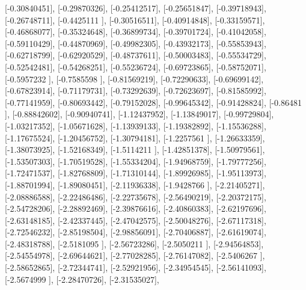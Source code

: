 \documentclass{article}
\begin{document}
       [-0.30840451],
       [-0.29870326],
       [-0.25412517],
       [-0.25651847],
       [-0.39718943],
       [-0.26748711],
       [-0.4425111 ],
       [-0.30516511],
       [-0.40914848],
       [-0.33159571],
       [-0.46868077],
       [-0.35324648],
       [-0.36899734],
       [-0.39701724],
       [-0.41042058],
       [-0.59110429],
       [-0.44870969],
       [-0.49982305],
       [-0.43932173],
       [-0.55853943],
       [-0.62718799],
       [-0.62920529],
       [-0.48737611],
       [-0.50003483],
       [-0.55534729],
       [-0.52542481],
       [-0.54268251],
       [-0.55236724],
       [-0.69723865],
       [-0.58752071],
       [-0.5957232 ],
       [-0.7585598 ],
       [-0.81569219],
       [-0.72290633],
       [-0.69699142],
       [-0.67823914],
       [-0.71179731],
       [-0.73292639],
       [-0.72623697],
       [-0.81585992],
       [-0.77141959],
       [-0.80693442],
       [-0.79152028],
       [-0.99645342],
       [-0.91428824],
       [-0.86481   ],
       [-0.88842602],
       [-0.90940741],
       [-1.12437952],
       [-1.13849017],
       [-0.99729804],
       [-1.03217352],
       [-1.05671628],
       [-1.13939133],
       [-1.19382892],
       [-1.15536288],
       [-1.17675524],
       [-1.20456752],
       [-1.30794181],
       [-1.2257561 ],
       [-1.26633359],
       [-1.38073925],
       [-1.52168349],
       [-1.5114211 ],
       [-1.42851378],
       [-1.50979561],
       [-1.53507303],
       [-1.70519528],
       [-1.55334204],
       [-1.94968759],
       [-1.79777256],
       [-1.72471537],
       [-1.82768809],
       [-1.71310144],
       [-1.89926985],
       [-1.95113973],
       [-1.88701994],
       [-1.89080451],
       [-2.11936338],
       [-1.9428766 ],
       [-2.21405271],
       [-2.08886588],
       [-2.22486486],
       [-2.22735678],
       [-2.56490219],
       [-2.20372175],
       [-2.54728206],
       [-2.28892469],
       [-2.39876616],
       [-2.40860383],
       [-2.62197696],
       [-2.63148185],
       [-2.42337445],
       [-2.47042575],
       [-2.50048276],
       [-2.67117318],
       [-2.72546232],
       [-2.85198504],
       [-2.98856091],
       [-2.70406887],
       [-2.61619074],
       [-2.48318788],
       [-2.5181095 ],
       [-2.56723286],
       [-2.5050211 ],
       [-2.94564853],
       [-2.54554978],
       [-2.69644621],
       [-2.77028285],
       [-2.76147082],
       [-2.5406267 ],
       [-2.58652865],
       [-2.72344741],
       [-2.52921956],
       [-2.34954545],
       [-2.56141093],
       [-2.5674999 ],
       [-2.28470726],
       [-2.31535027],
\end{document}
